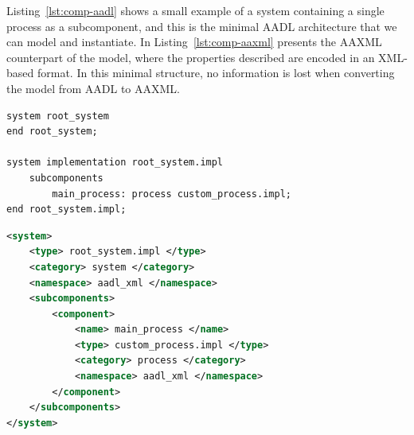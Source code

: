 Listing~\ref{lst:comp-aadl} shows a small example of a system containing a single process as a subcomponent, and this is the minimal AADL architecture that we can model and instantiate. In Listing~\ref{lst:comp-aaxml} presents the AAXML counterpart of the model, where the properties described are encoded in an XML-based format. In this minimal structure, no information is lost when converting the model from AADL to AAXML.

\begin{lstlisting}[language=AADL,caption={Minimal AADL model},label=lst:comp-aadl]
system root_system
end root_system;

system implementation root_system.impl
	subcomponents
		main_process: process custom_process.impl;
end root_system.impl;
\end{lstlisting}

\begin{lstlisting}[language=XML,caption={AAXML representation of the minimal AADL model},label=lst:comp-aaxml]
<system>
	<type> root_system.impl </type>
	<category> system </category>
	<namespace> aadl_xml </namespace>
	<subcomponents>
		<component>
			<name> main_process </name>
			<type> custom_process.impl </type>
			<category> process </category>
			<namespace> aadl_xml </namespace>
		</component>
	</subcomponents>
</system>
\end{lstlisting}

